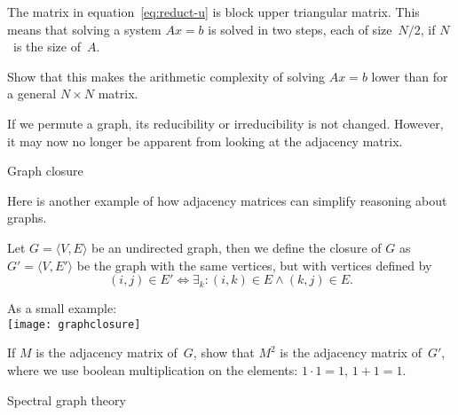 The matrix in equation~\ref{eq:reduct-u}
is block upper triangular matrix.
This means that solving a system $Ax=b$ is solved
in two steps, each of size~$N/2$, if $N$~is the size of~$A$.

\begin{exercise}
  Show that this makes the arithmetic complexity
  of solving $Ax=b$ lower than for a general $N\times N$ matrix.
\end{exercise}

If we permute a graph, its reducibility or irreducibility is not
changed. However, it may now no longer be apparent from looking 
at the adjacency matrix.

 {Graph closure}
\label{app:graph-closure}

Here is another example of how adjacency matrices can simplify
reasoning about graphs.

\begin{definition}
  Let $G=\langle V,E\rangle$ be an undirected graph,
  then we define the closure of $G$ as $G'=\langle  V,E'\rangle$
  be the graph with the same vertices, but with vertices
  defined by
  \[ (i,j)\in E'\Leftrightarrow \exists_k\colon (i,k)\in E\wedge
  (k,j)\in E. \]
\end{definition}

As a small example:\\
\texttt{[image: graphclosure]}
  
\begin{exercise}
  If $M$ is the adjacency matrix of~$G$, show that $M^2$ is the
  adjacency matrix of~$G'$, where we use boolean multiplication on the
  elements: $1\cdot1=1$, $1+1=1$.
\end{exercise}

 {Spectral graph theory}
\label{app:fiedler}

